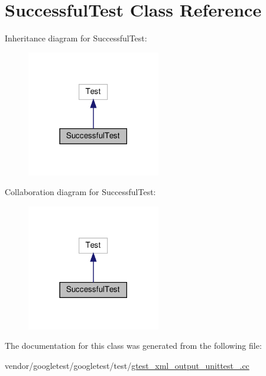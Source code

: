 \hypertarget{class_successful_test}{}\section{Successful\+Test Class Reference}
\label{class_successful_test}


Inheritance diagram for Successful\+Test\+:
\nopagebreak
\begin{figure}[H]
\begin{center}
\leavevmode
\includegraphics[width=165pt]{class_successful_test__inherit__graph}
\end{center}
\end{figure}


Collaboration diagram for Successful\+Test\+:
\nopagebreak
\begin{figure}[H]
\begin{center}
\leavevmode
\includegraphics[width=165pt]{class_successful_test__coll__graph}
\end{center}
\end{figure}


The documentation for this class was generated from the following file\+:\begin{DoxyCompactItemize}
\item 
vendor/googletest/googletest/test/\hyperlink{gtest__xml__output__unittest___8cc}{gtest\+\_\+xml\+\_\+output\+\_\+unittest\+\_\+.\+cc}\end{DoxyCompactItemize}
